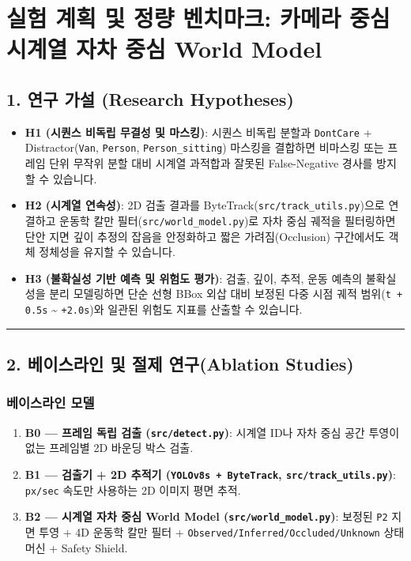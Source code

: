 \documentclass[10.5pt,a4paper]{article}
\begin{document}
\newpage
\section{실험 계획 및 정량 벤치마크: 카메라 중심 시계열 자차 중심 World Model}

\subsection{1. 연구 가설 (Research Hypotheses)}

\begin{itemize}[leftmargin=1.5em,itemsep=2pt]
\item \textbf{H1 (시퀀스 비독립 무결성 및 마스킹)}: 시퀀스 비독립 분할과 \texttt{DontCare} + Distractor(\texttt{Van}, \texttt{Person}, \texttt{Person\_\allowbreak{}sitting}) 마스킹을 결합하면 비마스킹 또는 프레임 단위 무작위 분할 대비 시계열 과적합과 잘못된 False-Negative 경사를 방지할 수 있습니다.
\item \textbf{H2 (시계열 연속성)}: 2D 검출 결과를 ByteTrack(\texttt{src/\allowbreak{}track\_\allowbreak{}utils.\allowbreak{}py})으로 연결하고 운동학 칼만 필터(\texttt{src/\allowbreak{}world\_\allowbreak{}model.\allowbreak{}py})로 자차 중심 궤적을 필터링하면 단안 지면 깊이 추정의 잡음을 안정화하고 짧은 가려짐(Occlusion) 구간에서도 객체 정체성을 유지할 수 있습니다.
\item \textbf{H3 (불확실성 기반 예측 및 위험도 평가)}: 검출, 깊이, 추적, 운동 예측의 불확실성을 분리 모델링하면 단순 선형 BBox 외삽 대비 보정된 다중 시점 궤적 범위(\texttt{t + 0.\allowbreak{}5s} \textasciitilde{} \texttt{+2.\allowbreak{}0s})와 일관된 위험도 지표를 산출할 수 있습니다.
\end{itemize}

\par\noindent\rule{\textwidth}{0.4pt}\par\medskip

\subsection{2. 베이스라인 및 절제 연구(Ablation Studies)}

\subsubsection{베이스라인 모델}
\begin{enumerate}[leftmargin=1.8em,itemsep=2pt]
\item \textbf{B0 --- 프레임 독립 검출 (\texttt{src/\allowbreak{}detect.\allowbreak{}py})}: 시계열 ID나 자차 중심 공간 투영이 없는 프레임별 2D 바운딩 박스 검출.
\item \textbf{B1 --- 검출기 + 2D 추적기 (\texttt{YOLOv8s + ByteTrack}, \texttt{src/\allowbreak{}track\_\allowbreak{}utils.\allowbreak{}py})}: \texttt{px/\allowbreak{}sec} 속도만 사용하는 2D 이미지 평면 추적.
\item \textbf{B2 --- 시계열 자차 중심 World Model (\texttt{src/\allowbreak{}world\_\allowbreak{}model.\allowbreak{}py})}: 보정된 \texttt{P2} 지면 투영 + 4D 운동학 칼만 필터 + \texttt{Observed/\allowbreak{}Inferred/\allowbreak{}Occluded/\allowbreak{}Unknown} 상태 머신 + Safety Shield.
\end{enumerate}
\end{document}
